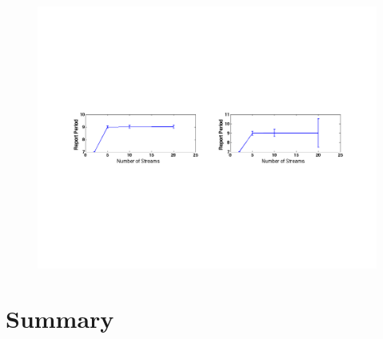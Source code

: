 \begin{figure}[t!] %
\centering
\includegraphics[width=1.0	\columnwidth]{figs/period_vs_streams}
\caption{}
\label{fig:report_periods}
\end{figure}


\section{Summary}






